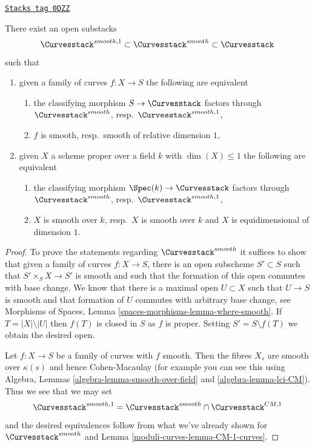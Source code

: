 \begin{lemma}
\label{moduli-curves-lemma-smooth-curves}
\href{https://stacks.math.columbia.edu/tag/0DZZ}{\texttt{Stacks tag 0DZZ}}

There exist an open substacks
$$
\Curvesstack^{smooth, 1} \subset \Curvesstack^{smooth} \subset \Curvesstack
$$
such that
\begin{enumerate}
\item given a family of curves $f : X \to S$ the following are equivalent
\begin{enumerate}
\item the classifying morphism $S \to \Curvesstack$ factors
through $\Curvesstack^{smooth}$, resp.\ $\Curvesstack^{smooth, 1}$,
\item $f$ is smooth, resp.\ smooth of relative dimension $1$,
\end{enumerate}
\item given $X$ a scheme proper over a field $k$ with
$\dim(X) \leq 1$ the following are equivalent
\begin{enumerate}
\item the classifying morphism $\Spec(k) \to \Curvesstack$
factors through $\Curvesstack^{smooth}$, resp.\ $\Curvesstack^{smooth, 1}$,
\item $X$ is smooth over $k$, resp.\ $X$ is smooth over $k$ and
$X$ is equidimensional of dimension $1$.
\end{enumerate}
\end{enumerate}
\end{lemma}

\begin{proof}
To prove the statements regarding $\Curvesstack^{smooth}$
it suffices to show that given a family of curves
$f : X \to S$, there is an open subscheme $S' \subset S$
such that $S' \times_S X \to S'$ is smooth and such that the
formation of this open commutes with base change.
We know that there is a maximal open $U \subset X$ such
that $U \to S$ is smooth and that formation of $U$ commutes
with arbitrary base change, see
Morphisms of Spaces, Lemma \ref{spaces-morphisms-lemma-where-smooth}.
If $T = |X| \setminus |U|$ then $f(T)$ is closed in $S$ as $f$ is proper.
Setting $S' = S \setminus f(T)$ we obtain the desired open.

\medskip\noindent
Let $f : X \to S$ be a family of curves with $f$ smooth.
Then the fibres $X_s$ are smooth over $\kappa(s)$ and hence
Cohen-Macaulay (for example you can see this using
Algebra, Lemmas \ref{algebra-lemma-smooth-over-field} and
\ref{algebra-lemma-lci-CM}). Thus we see that we may set
$$
\Curvesstack^{smooth, 1} = \Curvesstack^{smooth} \cap
\Curvesstack^{CM, 1}
$$
and the desired equivalences follow from what we've already
shown for $\Curvesstack^{smooth}$ and Lemma \ref{moduli-curves-lemma-CM-1-curves}.
\end{proof}

